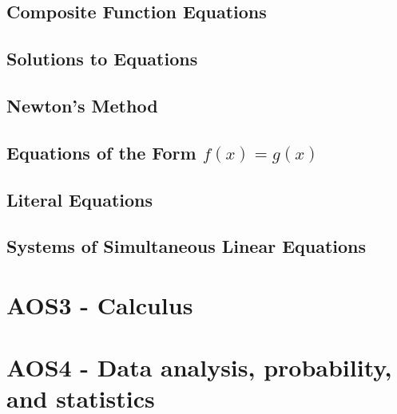 \documentclass{article}
\begin{document}
		\subsection{Composite Function Equations}
		\subsection{Solutions to Equations}
		\subsection{Newton's Method}
		\subsection{Equations of the Form $f(x)=g(x)$}
		\subsection{Literal Equations}
		\subsection{Systems of Simultaneous Linear Equations}
	\section*{AOS3 - Calculus}
	\section*{AOS4 - Data analysis, probability, and statistics}
\end{document}
